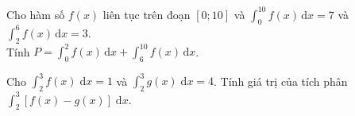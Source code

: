 
\begin{bt}%
	Cho hàm số $f(x)$ liên tục trên đoạn $[0; 10]$ và $\displaystyle\int_0^{10}f(x)\mathrm{\,d}x=7$ và  $\displaystyle\int_2^6f(x)\mathrm{\,d}x=3$.\\ Tính $P=\displaystyle\int_0^2f(x)\mathrm{\,d}x+\int_6^{10}f(x)\mathrm{\,d}x$.
\end{bt}

\begin{bt}%
	 Cho
	$\displaystyle\int_{2}^{3}  f(x) \;\mathrm{d}x=1$
	và 
	$\displaystyle\int_{2}^{3} g(x)  \;\mathrm{d}x=4$.
	Tính giá  trị của tích phân
	$\displaystyle\int_{2}^{3}  \left[f(x)-g(x) \right] \;\mathrm{d}x$.
\end{bt}

